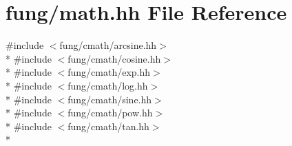 \hypertarget{math_8hh}{\section{fung/math.hh File Reference}
\label{math_8hh}
}
{\ttfamily \#include $<$fung/cmath/arcsine.\-hh$>$}\\*
{\ttfamily \#include $<$fung/cmath/cosine.\-hh$>$}\\*
{\ttfamily \#include $<$fung/cmath/exp.\-hh$>$}\\*
{\ttfamily \#include $<$fung/cmath/log.\-hh$>$}\\*
{\ttfamily \#include $<$fung/cmath/sine.\-hh$>$}\\*
{\ttfamily \#include $<$fung/cmath/pow.\-hh$>$}\\*
{\ttfamily \#include $<$fung/cmath/tan.\-hh$>$}\\*
